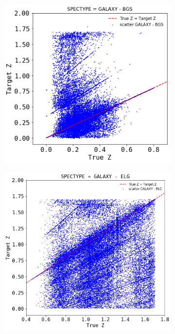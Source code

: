 \begin{figure}[!htbp]
	\centering
	\begin{subfigure}[b]{0.5\textwidth}
		\includegraphics[width=1\linewidth]{TeX_files/Imagenes/BGS-z-truez}
		\caption{}
		\label{fig:BGS-z-truez} 
	\end{subfigure}	
	\begin{subfigure}[b]{0.5\textwidth}
		\includegraphics[width=1\linewidth]{TeX_files/Imagenes/ELG-z-truez}

\end{subfigure}
\end{figure}

